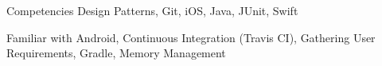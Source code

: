 


\begin{cvskills}


  \cvskill
  {Competencies}
  {Design Patterns, Git, iOS, Java, JUnit, Swift}


  \cvskill
  {Familiar with}
  {Android, Continuous Integration (Travis CI), Gathering User Requirements, Gradle, Memory Management}


\end{cvskills}